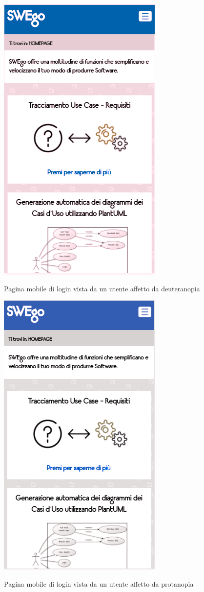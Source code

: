 	\begin{figure}
	\centering
		\includegraphics[scale=1]{img/deuteranopia_mobile.png}\\[1cm] \caption{Pagina mobile di login vista da un utente affetto da deuteranopia}
	\end{figure}
	\begin{figure}
	\centering
		\includegraphics[scale=1]{img/protanopia_mobile.png}\\[1cm] \caption{Pagina mobile di login vista da un utente affetto da protanopia}
	\end{figure}
